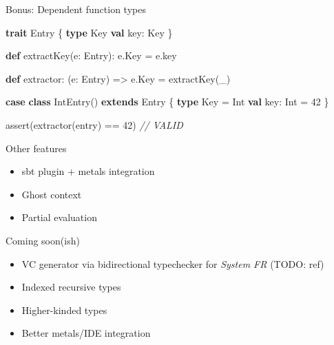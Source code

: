 \documentclass[
  ignorenonframetext,
]{beamer}
\newenvironment{Shaded}{}{}
\newcommand{\CommentTok}[1]{\textcolor[rgb]{0.38,0.63,0.69}{\textit{#1}}}
\newcommand{\DecValTok}[1]{\textcolor[rgb]{0.25,0.63,0.44}{#1}}
\newcommand{\FunctionTok}[1]{\textcolor[rgb]{0.02,0.16,0.49}{#1}}
\newcommand{\KeywordTok}[1]{\textcolor[rgb]{0.00,0.44,0.13}{\textbf{#1}}}
\newcommand{\NormalTok}[1]{#1}
\providecommand{\tightlist}{%
  \setlength{\itemsep}{0pt}\setlength{\parskip}{0pt}}
\begin{document}
\begin{frame}[fragile]{Bonus: Dependent function types}
\protect\hypertarget{bonus-dependent-function-types}{}

\begin{Shaded}
\begin{Highlighting}[]
\KeywordTok{trait}\NormalTok{ Entry \{}
  \KeywordTok{type}\NormalTok{ Key}
  \KeywordTok{val}\NormalTok{ key: Key}
\NormalTok{\}}

\KeywordTok{def} \FunctionTok{extractKey}\NormalTok{(e: Entry): e.}\FunctionTok{Key}\NormalTok{ = e.}\FunctionTok{key}

\KeywordTok{def}\NormalTok{ extractor: (e: Entry) => e.}\FunctionTok{Key}\NormalTok{ = }\FunctionTok{extractKey}\NormalTok{(_)}
\end{Highlighting}
\end{Shaded}

\end{frame}

\begin{frame}[fragile]

\begin{Shaded}
\begin{Highlighting}[]
\KeywordTok{case} \KeywordTok{class} \FunctionTok{IntEntry}\NormalTok{() }\KeywordTok{extends}\NormalTok{ Entry \{}
  \KeywordTok{type}\NormalTok{ Key = Int}
  \KeywordTok{val}\NormalTok{ key: Int = }\DecValTok{42}
\NormalTok{\}}

\FunctionTok{assert}\NormalTok{(}\FunctionTok{extractor}\NormalTok{(entry) == }\DecValTok{42}\NormalTok{) }\CommentTok{// VALID}
\end{Highlighting}
\end{Shaded}

\end{frame}

\begin{frame}{Other features}
\protect\hypertarget{other-features}{}

\begin{itemize}
\tightlist
\item
  sbt plugin + metals integration
\item
  Ghost context
\item
  Partial evaluation
\end{itemize}

\end{frame}

\begin{frame}{Coming soon(ish)}
\protect\hypertarget{coming-soonish}{}

\begin{itemize}
\tightlist
\item
  VC generator via bidirectional typechecker for \emph{System FR} (TODO:
  ref)
\item
  Indexed recursive types
\item
  Higher-kinded types
\item
  Better metals/IDE integration
\end{itemize}

\end{frame}
\end{document}
